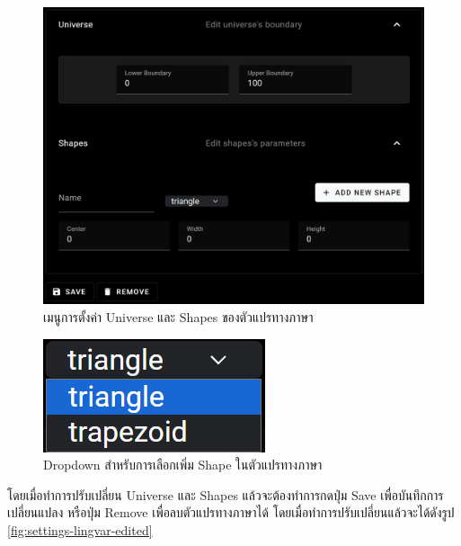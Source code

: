 \begin{figure}[ht]
    \centering
    \includegraphics[scale=0.5]{images/web-tuts/settings-lingvar-editor.PNG}
    \caption{เมนูการตั้งค่า Universe และ Shapes ของตัวแปรทางภาษา}
    \label{fig:settings-lingvar-editor}
\end{figure}
\begin{figure}[ht]
    \centering
    \includegraphics[scale=0.75]{images/web-tuts/settings-lingvar-shapes-dd.PNG}
    \caption{Dropdown สำหรับการเลือกเพิ่ม Shape ในตัวแปรทางภาษา}
    \label{fig:settings-lingvar-shapes-dd}
\end{figure}
\FloatBarrier
โดยเมื่อทำการปรับเปลี่ยน Universe และ Shapes แล้วจะต้องทำการกดปุ่ม Save เพื่อบันทึกการเปลี่ยนแปลง หรือปุ่ม Remove เพื่อลบตัวแปรทางภาษาได้ โดยเมื่อทำการปรับเปลี่ยนแล้วจะได้ดังรูป \ref{fig:settings-lingvar-edited}
